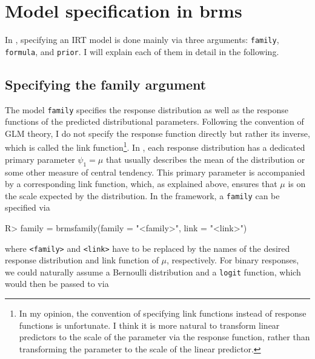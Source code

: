 \documentclass[
]{jss}
\begin{document}
\hypertarget{brms}{%
\section{Model specification in brms}\label{brms}}

In , specifying an IRT model is done mainly via three
arguments: \texttt{family}, \texttt{formula}, and \texttt{prior}. I will
explain each of them in detail in the following.

\hypertarget{family-prior}{%
\subsection{Specifying the family argument}\label{family-prior}}

The model \texttt{family} specifies the response distribution as well as
the response functions of the predicted distributional parameters.
Following the convention of GLM theory, I do not specify the response
function directly but rather its inverse, which is called the link
function\footnote{In my opinion, the
convention of specifying link functions instead of response functions is
unfortunate. I think it is more natural to transform linear predictors to the
scale of the parameter via the response function, rather than transforming the
parameter to the scale of the linear predictor.}. In , each
response distribution has a dedicated primary parameter \(\psi_1 = \mu\)
that usually describes the mean of the distribution or some other
measure of central tendency. This primary parameter is accompanied by a
corresponding link function, which, as explained above, ensures that
\(\mu\) is on the scale expected by the distribution. In the 
framework, a \texttt{family} can be specified via

\begin{CodeChunk}

\begin{CodeInput}
R> family = brmsfamily(family = "<family>", link = "<link>")
\end{CodeInput}
\end{CodeChunk}

where \texttt{\textless{}family\textgreater{}} and
\texttt{\textless{}link\textgreater{}} have to be replaced by the names
of the desired response distribution and link function of \(\mu\),
respectively. For binary responses, we could naturally assume a
Bernoulli distribution and a \texttt{logit} function, which would then
be passed to  via
\end{document}
